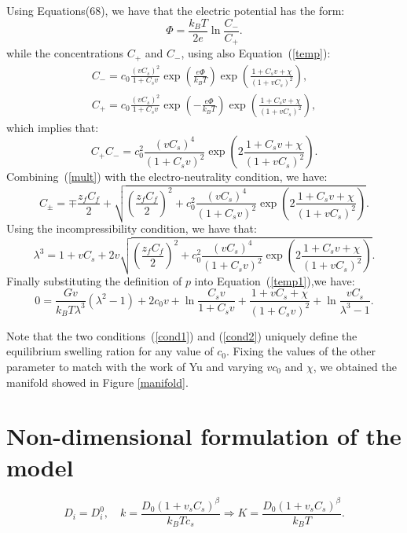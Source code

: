 Using Equations(68), we have that the electric potential has the form:
\begin{equation}
\Phi= \frac{k_BT}{2e}\ln\frac{C_-}{C_+}.
\end{equation}
while the concentrations $C_+$ and $C_-$, using also Equation~(\ref{temp}):
\begin{gather}
C_- = c_0 \frac{(v C_s)^2}{1+C_sv} \exp\left(\frac{e\Phi}{k_BT}\right) \exp\left(\frac{1+C_sv+\chi}{(1+vC_s)^2}\right),\\
C_+ = c_0 \frac{(v C_s)^2}{1+C_sv} \exp\left(-\frac{e\Phi}{k_BT}\right) \exp\left(\frac{1+C_sv+\chi}{(1+vC_s)^2}\right),
\end{gather}
which implies that:
\begin{equation}
C_+C_-= c^2_0\frac{(v C_s)^4}{(1+C_sv)^2} \exp\left(2\frac{1+C_sv+\chi}{(1+vC_s)^2}\right).\label{mult}
\end{equation}
Combining~(\ref{mult}) with the electro-neutrality condition, we have:
\begin{equation}
C_\pm = \mp \frac{z_fC_f}{2} + \sqrt{\left( \frac{z_fC_f}{2} \right)^2 + c^2_0\frac{(v C_s)^4}{(1+C_sv)^2} \exp\left(2\frac{1+C_sv+\chi}{(1+vC_s)^2}\right)}.
\end{equation}
Using the incompressibility condition, we have that:
\begin{equation}
\lambda^3=1+vC_s + 2v  \sqrt{\left( \frac{z_fC_f}{2} \right)^2 + c^2_0\frac{(v C_s)^4}{(1+C_sv)^2} \exp\left(2\frac{1+C_sv+\chi}{(1+vC_s)^2}\right)}\label{cond1}.
\end{equation}
Finally substituting the definition of $p$ into Equation~(\ref{temp1}),we have:
\begin{equation}
0=\frac{Gv}{k_BT\lambda^3}(\lambda^2-1) + 2c_0v + \ln \frac{C_sv}{1+C_sv} + \frac{1+vC_s+\chi}{(1+C_sv)^2} + \ln \frac{vC_s}{\lambda^3-1}.\label{cond2}
\end{equation}

Note that the two conditions~(\ref{cond1}) and (\ref{cond2}) uniquely define the equilibrium swelling ration for any value of $c_0$. Fixing the values of the other parameter to match with the work of Yu and varying $vc_0$ and $\chi$, we obtained the manifold showed in Figure \ref{manifold}.

\section{Non-dimensional formulation of the model}
\begin{equation}
D_i=D_i^0,\quad k = \frac{D_0(1+v_sC_s)^\beta}{k_B T c_s} \Rightarrow K=  \frac{D_0(1+v_sC_s)^\beta}{k_B T}.
\end{equation}

